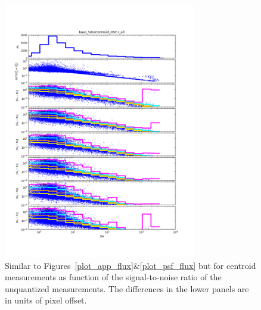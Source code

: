 \begin{figure}
\centering
\includegraphics[width=0.75\textwidth]{figure/rplot_all_base_SdssCentroid_HSC-I.png}
\caption{Similar to Figures~\ref{plot_app_flux}\&\ref{plot_psf_flux} but for centroid measurements as function of the signal-to-noise ratio
of the unquantized measurements.  The differences in the lower panels are in units of pixel offset.}
\label{plot_cen}
\end{figure}

